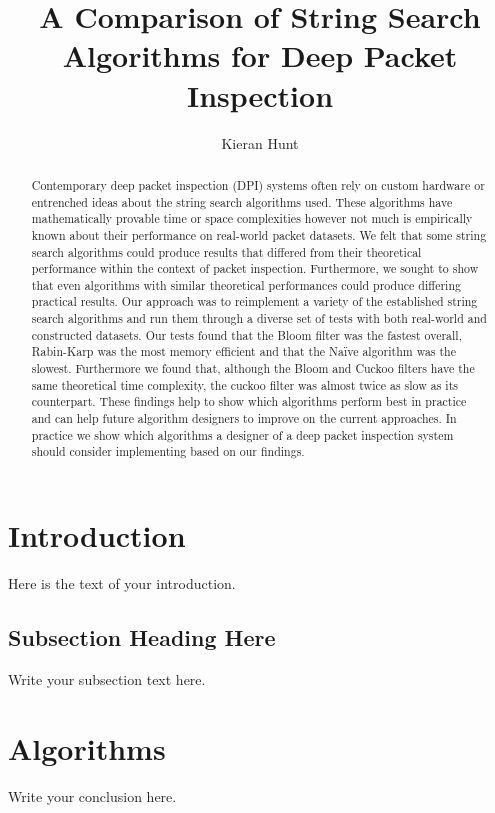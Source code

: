 \documentclass{article}
\begin{document}
\title{A Comparison of String Search Algorithms for Deep Packet Inspection}
\author{Kieran Hunt}

\maketitle

\begin{abstract}
Contemporary deep packet inspection (DPI) systems often rely on custom hardware or entrenched ideas about the string search algorithms used. These algorithms have mathematically provable time or space complexities however not much is empirically known about their performance on real-world packet datasets. We felt that some string search algorithms could produce results that differed from their theoretical performance within the context of packet inspection. Furthermore, we sought to show that even algorithms with similar theoretical performances could produce differing practical results. Our approach was to reimplement a variety of the established string search algorithms and run them through a diverse set of tests with both real-world and constructed datasets. Our tests found that the Bloom filter was the fastest overall, Rabin-Karp was the most memory efficient and that the Naïve algorithm was the slowest. Furthermore we found that, although the Bloom and Cuckoo filters have the same theoretical time complexity, the cuckoo filter was almost twice as slow as its counterpart. These findings help to show which algorithms perform best in practice and can help future algorithm designers to improve on the current approaches. In practice we show which algorithms a designer of a deep packet inspection system should consider implementing based on our findings.

\end{abstract}

\section{Introduction}
Here is the text of your introduction. \cite{Karp1987}

\subsection{Subsection Heading Here}
Write your subsection text here.

\section{Algorithms}
Write your conclusion here.
\end{document}
